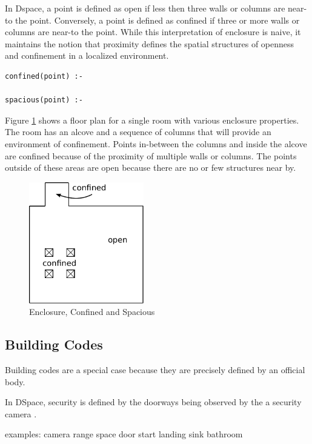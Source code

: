 \documentclass[12pt]{ucthesis}
\begin{document}
In Dspace, a point is defined as open if less then three walls or columns are near-to the point. Conversely, a point is defined as confined if three or more walls or columns are near-to the point. While this interpretation of enclosure is naive, it maintains the notion that proximity defines the spatial structures of openness and confinement in a localized environment.   


\begin{verbatim}
confined(point) :-  

spacious(point) :-

\end{verbatim} 


Figure \ref{enclosure} shows a floor plan for a single room with various enclosure properties. The room has an alcove and a sequence of columns that will provide an environment of confinement. Points in-between the columns and inside the alcove are confined because of the proximity of multiple walls or columns. The points outside of these areas are open because there are no or few structures near by.


\begin{figure}[H]
\centering
\includegraphics[width=50mm]{spacious-confined}
\caption{Enclosure, Confined and Spacious}
\label{enclosure}
\end{figure}


\subsection{Building Codes}
Building codes are a special case because they are precisely defined by an official body. 
 
In DSpace, security is defined by the doorways being observed by the a security camera \cite{Bhatt}. 

examples: camera range space door
          start landing
          sink bathroom
          
\end{document}
